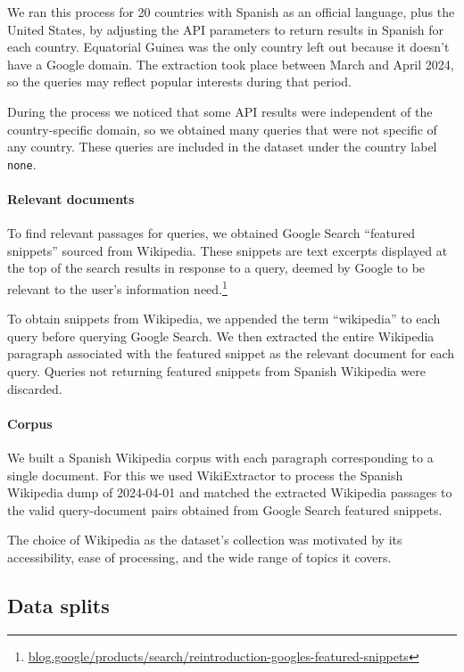 \documentclass[11pt]{article}
\begin{document}
We ran this process for 20 countries with Spanish as an official language, plus the United States, by adjusting the API parameters to return results in Spanish for each country. Equatorial Guinea was the only country left out because it doesn't have a Google domain. The extraction took place between March and April 2024, so the queries may reflect popular interests during that period.

During the process we noticed that some API results were independent of the country-specific domain, so we obtained many queries that were not specific of any country. These queries are included in the dataset under the country label \texttt{none}.



\paragraph{Relevant documents} To find relevant passages for queries, we obtained Google Search ``featured snippets'' sourced from Wikipedia. These snippets are text excerpts displayed at the top of the search results in response to a query, deemed by Google to be relevant to the user's information need.\footnote{\href{https://blog.google/products/search/reintroduction-googles-featured-snippets/}{blog.google/products/search/reintroduction-googles-featured-snippets}}


To obtain snippets from Wikipedia, we appended the term ``wikipedia'' to each query before querying Google Search. We then extracted the entire Wikipedia paragraph associated with the featured snippet as the relevant document for each query. Queries not returning featured snippets from Spanish Wikipedia were discarded.


\paragraph{Corpus} We built a Spanish Wikipedia corpus with each paragraph corresponding to a single document. For this we used WikiExtractor \citep{attardi2015wikiextractor} to process the Spanish Wikipedia dump of 2024-04-01 and matched the extracted Wikipedia passages to the valid query-document pairs obtained from Google Search featured snippets.

The choice of Wikipedia as the dataset's collection was motivated by its accessibility, ease of processing, and the wide range of topics it covers.


\subsection{Data splits} \label{sec:data_splits}
\end{document}
